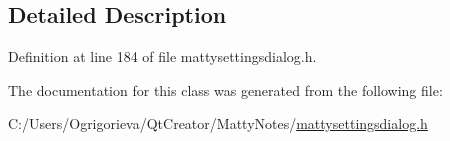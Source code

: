 \subsection{Detailed Description}


Definition at line 184 of file mattysettingsdialog.\+h.



The documentation for this class was generated from the following file\+:\begin{DoxyCompactItemize}
\item 
C\+:/\+Users/\+Ogrigorieva/\+Qt\+Creator/\+Matty\+Notes/\hyperlink{mattysettingsdialog_8h}{mattysettingsdialog.\+h}\end{DoxyCompactItemize}
